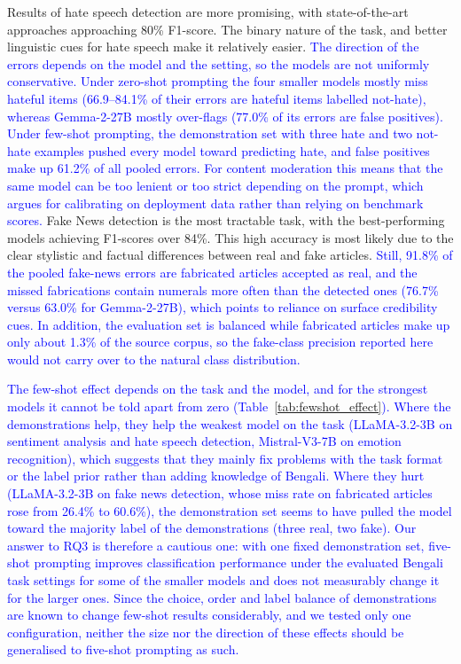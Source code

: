 \documentclass[10pt,letterpaper]{article}
\newcommand{\rev}[1]{\textcolor{blue}{#1}}
\begin{document}
Results of hate speech detection are more promising, with state-of-the-art approaches approaching 80\% F1-score. The binary nature of the task, and better linguistic cues for hate speech make it relatively easier. \rev{The direction of the errors depends on the model and the setting, so the models are not uniformly conservative. Under zero-shot prompting the four smaller models mostly miss hateful items (66.9--84.1\% of their errors are hateful items labelled not-hate), whereas Gemma-2-27B mostly over-flags (77.0\% of its errors are false positives). Under few-shot prompting, the demonstration set with three hate and two not-hate examples pushed every model toward predicting hate, and false positives make up 61.2\% of all pooled errors. For content moderation this means that the same model can be too lenient or too strict depending on the prompt, which argues for calibrating on deployment data rather than relying on benchmark scores.} Fake News detection is the most tractable task, with the best-performing models achieving F1-scores over 84\%. This high accuracy is most likely due to the clear stylistic and factual differences between real and fake articles. \rev{Still, 91.8\% of the pooled fake-news errors are fabricated articles accepted as real, and the missed fabrications contain numerals more often than the detected ones (76.7\% versus 63.0\% for Gemma-2-27B), which points to reliance on surface credibility cues. In addition, the evaluation set is balanced while fabricated articles make up only about 1.3\% of the source corpus, so the fake-class precision reported here would not carry over to the natural class distribution.}

\rev{The few-shot effect depends on the task and the model, and for the strongest models it cannot be told apart from zero (Table~\ref{tab:fewshot_effect}). Where the demonstrations help, they help the weakest model on the task (LLaMA-3.2-3B on sentiment analysis and hate speech detection, Mistral-V3-7B on emotion recognition), which suggests that they mainly fix problems with the task format or the label prior rather than adding knowledge of Bengali. Where they hurt (LLaMA-3.2-3B on fake news detection, whose miss rate on fabricated articles rose from 26.4\% to 60.6\%), the demonstration set seems to have pulled the model toward the majority label of the demonstrations (three real, two fake). Our answer to RQ3 is therefore a cautious one: with one fixed demonstration set, five-shot prompting improves classification performance under the evaluated Bengali task settings for some of the smaller models and does not measurably change it for the larger ones. Since the choice, order and label balance of demonstrations are known to change few-shot results considerably, and we tested only one configuration, neither the size nor the direction of these effects should be generalised to five-shot prompting as such.}
\end{document}
